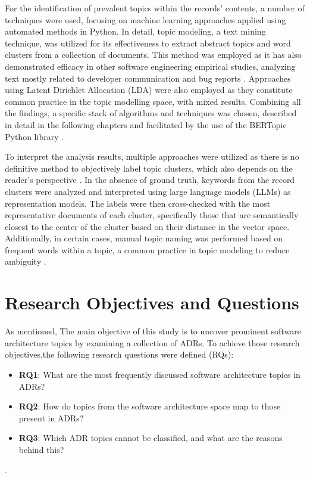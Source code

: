     For the identification of prevalent topics within the records' contents, a number of techniques were used, focusing on machine learning approaches applied using automated methods in Python. In detail, topic modeling, a text mining technique, was utilized for its effectiveness to extract abstract topics and word clusters from a collection of documents. This method was employed as it has also demonstrated efficacy in other software engineering empirical studies, analyzing text mostly related to developer communication and bug reports \cite{Topic_modeling_in_software_engineering_research}. Approaches using Latent Dirichlet Allocation (LDA) were also employed as they constitute common practice in the topic modelling space, with mixed results. Combining all the findings, a specific stack of algorithms and techniques was chosen, described in detail in the following chapters and facilitated by the use of the BERTopic Python library \cite{bertTopic}.

    To interpret the analysis results, multiple approaches were utilized as there is no definitive method to objectively label topic clusters, which also depends on the reader's perspective \cite{datasciencecentralTopicModeling}. In the absence of ground truth, keywords from the record clusters were analyzed and interpreted using large language models (LLMs) as representation models. The labels were then cross-checked with the most representative documents of each cluster, specifically those that are semantically closest to the center of the cluster based on their distance in the vector space. Additionally, in certain cases, manual topic naming was performed based on frequent words within a topic, a common practice in topic modeling to reduce ambiguity \cite{Topic_modeling_in_software_engineering_research}.
    
\section{Research Objectives and Questions}
    As mentioned, The main objective of this study is to uncover prominent software architecture topics by examining a collection of ADRs. To achieve those research objectives,the following research questions were defined (RQs):

    \begin{itemize}
        \item \textbf{RQ1}: What are the most frequently discussed software architecture topics in ADRs?
        \item \textbf{RQ2}: How do topics from the software architecture space map to those present in ADRs?
        \item \textbf{RQ3}: Which ADR topics cannot be classified, and what are the reasons behind this? 
    \end{itemize}. 

